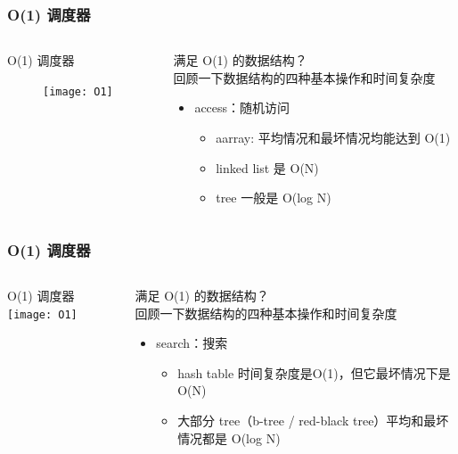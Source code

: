 \begin{frame}
	\frametitle{ O(1) 调度器}
	\begin{columns}
		\begin{column}{.4\textwidth}
			\Large \centering
			O(1) 调度器
            \begin{figure}
    			\texttt{[image: O1]}
            \end{figure}
			
		\end{column}
		
		\begin{column}{.6\textwidth}
			满足 O(1) 的数据结构？\\
			回顾一下数据结构的四种基本操作和时间复杂度
			\begin{itemize}
			\item access：随机访问
				\begin{itemize}
				\item aarray: 平均情况和最坏情况均能达到 O(1)
				\item linked list 是 O(N)
				\item tree 一般是 O(log N)
				\end{itemize}
			\end{itemize}
		\end{column}
	\end{columns}
\end{frame}


\begin{frame}
	\frametitle{ O(1) 调度器}
	\begin{columns}
		\begin{column}{.4\textwidth}
			\Large \centering
			O(1) 调度器
			\texttt{[image: O1]}
			
		\end{column}
		
		\begin{column}{.6\textwidth}
			满足 O(1) 的数据结构？\\
			回顾一下数据结构的四种基本操作和时间复杂度
			\begin{itemize}
				\item search：搜索
				\begin{itemize}
					\item hash table 时间复杂度是O(1)，但它最坏情况下是 O(N) 
					\item 大部分 tree（b-tree / red-black tree）平均和最坏情况都是 O(log N)
				\end{itemize}
			\end{itemize}
		\end{column}
	\end{columns}
\end{frame}


